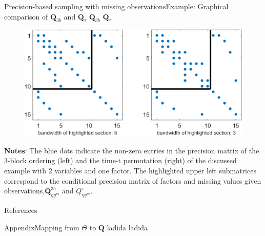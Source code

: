 \documentclass[xcolor=svgnames, 10pt, aspectratio=169]{beamer}
\begin{document}
\begin{frame}{Precision-based sampling with missing observations}{Example: Graphical comparison of $\mathbf{Q}_{3b}$ and $\mathbf{Q}_{\tau}$}
    \hspace{4.5cm} $\mathbf{Q}_{3b}$ \hspace{3.7cm} $\mathbf{Q}_{\tau}$

    \vspace{0.2cm}
    \begin{adjustbox}{minipage=0.6\textwidth,center}
        \begin{figure}
            \includegraphics[scale = 0.7]{fig_Q3b_Qtau.png}  \vspace{0.1cm} \\
        \end{figure}
            {\tiny \textbf{Notes}: The blue dots indicate the non-zero entries in the precision matrix of the 3-block ordering (left) and the time-t permutation (right) of the discussed example with 2 variables and one factor. The highlighted upper left submatrices correspond to the conditional precision matrix of factors and missing values given observations,$\mathbf{Q}^{3b}_{\eta y^m}$ and $Q^{\tau}_{\eta y^m}$.}\par
    \end{adjustbox}  

\end{frame}


\begin{frame}[t, allowframebreaks]{References}
    \scriptsize     
    
    
\end{frame}

\begin{frame}{Appendix}{Mapping from $\Theta$ to $\mathbf{Q}$}
\label{app_mapping}
ladida
ladida
\end{frame}
\end{document}
